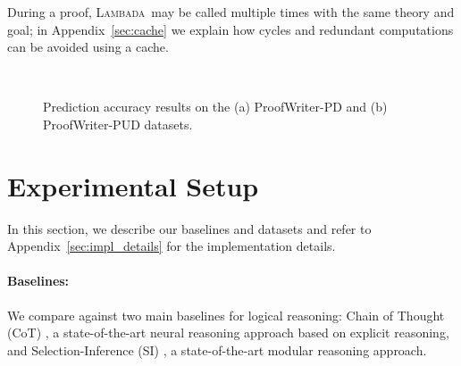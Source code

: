 \documentclass[11pt]{article}
\newcommand{\algo}{\textsc{Lambada}}
\begin{document}
During a proof, \algo\ may be called multiple times with the same theory and goal; in Appendix~\ref{sec:cache} we explain how cycles and redundant computations can be avoided using a cache.

\begin{figure}[t]
  \centering
~~~~\hspace*{0cm}

  \caption{%
  \label{fig:proofwriter} %
  Prediction accuracy results on the (a) ProofWriter-PD and (b) ProofWriter-PUD datasets.}
\end{figure}

\section{Experimental Setup}
In this section, we describe our baselines and datasets and refer to Appendix~\ref{sec:impl_details} for the implementation details.

\paragraph{Baselines:} We compare against two main baselines for logical reasoning: Chain of Thought (CoT) \cite{wei2022chain}, a state-of-the-art neural reasoning approach based on explicit reasoning, and Selection-Inference (SI) \cite{creswell2022selection}, a state-of-the-art modular reasoning approach.
\end{document}

